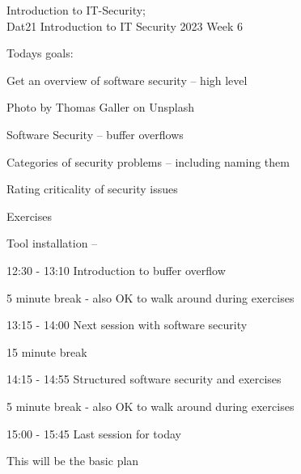 \documentclass[Screen16to9,17pt]{foils}
\begin{document}
{Introduction to IT-Security;\\Dat21 Introduction to IT Security 2023 Week 6}

\hlkprofiluk



Todays goals:
\begin{list2}
\item Get an overview of software security -- high level
\item
\end{list2}

  Photo by Thomas Galler on Unsplash


\begin{list2}
\item Software Security -- buffer overflows
\item Categories of security problems -- including naming them
\item Rating criticality of security issues
\end{list2}

Exercises
\begin{list2}
\item Tool installation --
\end{list2}




\begin{list1}
\item 12:30 - 13:10 Introduction to buffer overflow
\item 5 minute break - also OK to walk around during exercises
\item 13:15 - 14:00 Next session with software security
\item 15 minute break
\item 14:15 - 14:55 Structured software security and exercises
\item 5 minute break - also OK to walk around during exercises
\item 15:00 - 15:45 Last session for today
\end{list1}

\vskip 1cm
This will be the basic plan
\end{document}
